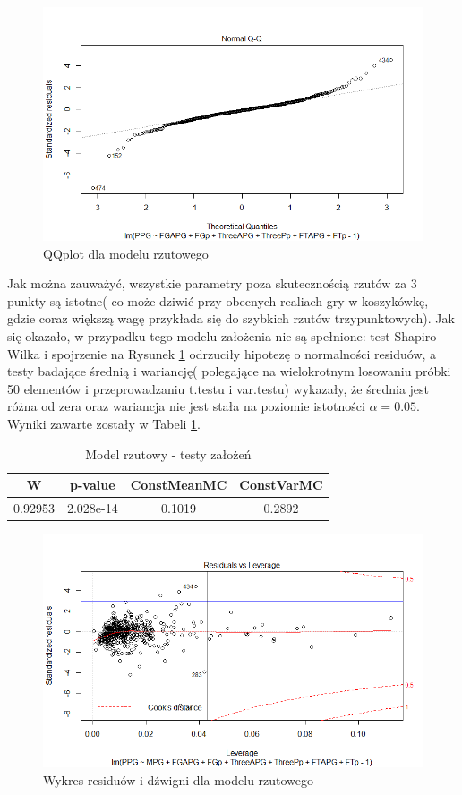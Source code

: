 \documentclass[11pt,a4paper]{article}
\begin{document}
\begin{figure}[t]
\includegraphics[width=\textwidth]{offense_2}
\caption{QQplot dla modelu rzutowego}
\label{qqplot_offense}
\centering
\end{figure}
Jak można zauważyć, wszystkie parametry poza skutecznością rzutów za 3 punkty są istotne( co może dziwić przy obecnych realiach gry w koszykówkę, gdzie coraz większą wagę przykłada się do szybkich rzutów trzypunktowych). Jak się okazało, w przypadku tego modelu założenia nie są spełnione: test Shapiro-Wilka i spojrzenie na Rysunek \ref{qqplot_offense} odrzuciły hipotezę o normalności residuów, a testy badające średnią i wariancję( polegające na wielokrotnym losowaniu próbki 50 elementów i przeprowadzaniu t.testu i var.testu) wykazały, że średnia jest różna od zera oraz wariancja nie jest stała na poziomie istotności $\alpha=0.05$. Wyniki zawarte zostały w Tabeli \ref{zalozenia_offense}.
\begin{table}[H]
	\begin{center}
	\begin{tabular}{| c | c | c | c |}
		\hline
		W & p-value & ConstMeanMC & ConstVarMC\\ \hline
		0.92953 & 2.028e-14 & 0.1019 & 0.2892 \\ \hline
	\end{tabular}
	\caption{Model rzutowy - testy założeń}
	\label{zalozenia_offense}
	\end{center}
\end{table}
\begin{figure}[t]
	\includegraphics[width=\textwidth]{offense_4}
	\caption{Wykres residuów i dźwigni dla modelu rzutowego}
	\label{leverage_offense}
	\centering
\end{figure}
\end{document}
